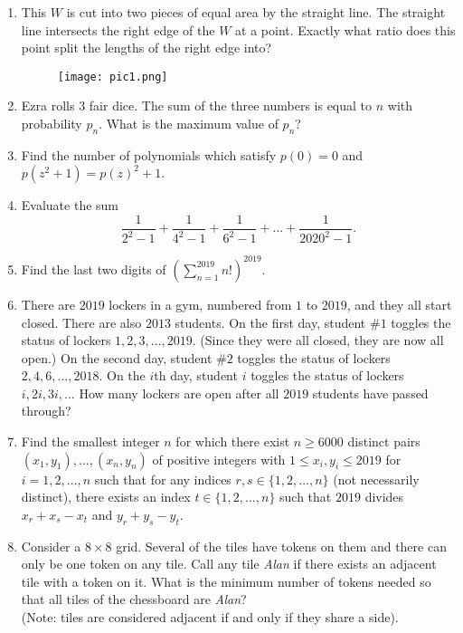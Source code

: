 \documentclass[12pt,titlepage]{article}
\begin{document}
\begin{enumerate}
    \item This $W$ is cut into two pieces of equal area by the straight line. The straight line intersects the right edge of the $W$ at a point. Exactly what ratio does this point split the lengths of the right edge into? 
    \begin{figure}[h]
    	\centering
    	\texttt{[image: pic1.png]}
    \end{figure}
    \item Ezra rolls $3$ fair dice. The sum of the three numbers is equal to $n$ with probability $p_n$. What is the maximum value of $p_n$?

    \item Find the number of polynomials which satisfy $p(0) = 0$ and $p(z^2 + 1) = p(z)^2 + 1$. 

    \item Evaluate the sum
    \[
    	\frac{1}{2^2 - 1} + \frac{1}{4^2 -1} + \frac{1}{6^2-1} + ... + \frac{1}{2020^2 - 1}. 
    \]

    \item Find the last two digits of $\displaystyle \left ( \sum_{n = 1}^{2019} n! \right )^{2019}$. 

    \item There are $2019$ lockers in a gym, numbered from $1$ to $2019$, and they all start closed. There are also $2013$ students. On the first day, student $\# 1$ toggles the status of lockers $1, 2, 3, ..., 2019$. (Since they were all closed, they are now all open.) On the second day, student $\# 2$ toggles the status of lockers $2, 4, 6, ..., 2018$. On the $i$th day, student $i$ toggles the status of lockers $i, 2i, 3i, ...$ How many lockers are open after all $2019$ students have passed through?  

    \item Find the smallest integer $n$ for which there exist $n \geq 6000$ distinct pairs $(x_1, y_1), ..., (x_n, y_n)$ of positive integers with $1 \leq x_i, y_i \leq 2019$ for $i = 1, 2, ..., n$ such that for any indices $r, s \in \{1, 2, ..., n\}$ (not necessarily distinct), there exists an index $t \in \{1, 2, ..., n\}$ such that $2019$ divides $x_r + x_s - x_t$ and $y_r + y_s - y_t$. 

    \item Consider a $8 \times 8$ grid. Several of the tiles have tokens on them and there can only be one token on any tile. Call any tile \textit{Alan} if there exists an adjacent tile with a token on it. What is the minimum number of tokens needed so that all tiles of the chessboard are \textit{Alan}? \\
    (Note: tiles are considered adjacent if and only if they share a side). 
\end{enumerate}
\end{document}
